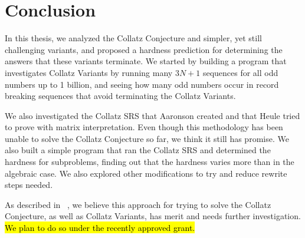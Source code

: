 \chapter{Conclusion} \label{sec:conclusion}
In this thesis, we analyzed the Collatz Conjecture and simpler, yet still challenging variants, and proposed a hardness prediction for determining the answers that these variants terminate. We started by building a program that investigates Collatz Variants by running many $3N+1$ sequences for all odd numbers up to 1 billion, and seeing how many odd numbers occur in record breaking sequences that avoid terminating the Collatz Variants. \par
We also investigated the Collatz SRS that Aaronson created and that Heule tried to prove with matrix interpretation. Even though this methodology has been unable to solve the Collatz Conjecture so far, we think it still has promise. We also built a simple program that ran the Collatz SRS and determined the hardness for subproblems, finding out that the hardness varies more than in the algebraic case. We also explored other modifications to try and reduce rewrite steps needed.\par
As described in ~\cite{HeuleAaronson}, we believe this approach for trying to solve the Collatz Conjecture, as well as Collatz Variants, has merit and needs further investigation. \hl{We plan to do so under the recently approved grant.}
